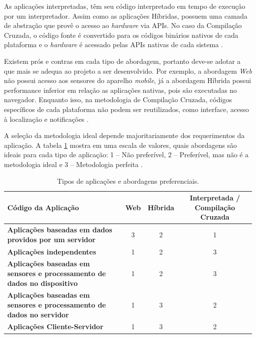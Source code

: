 As aplicações interpretadas, têm seu código interpretado em tempo de execução por um interpretador. Assim como as aplicações Híbridas, possuem uma camada de abstração que provê o acesso ao \textit{hardware} via APIs. No caso da Compilação Cruzada, o código fonte é convertido para os códigos binários nativos de cada plataforma e o \textit{hardware} é acessado pelas APIs nativas de cada sistema \cite{raj2012study}.

Existem prós e contras em cada tipo de abordagem, portanto deve-se adotar a que mais se adequa ao projeto a ser desenvolvido. Por exemplo, a abordagem \textit{Web} não possui acesso aos sensores do aparelho \textit{mobile}, já a abordagem Híbrida possui performance inferior em relação as aplicações nativas, pois são executadas no navegador. Enquanto isso, na metodologia de Compilação Cruzada, códigos específicos de cada plataforma não podem ser reutilizados, como interface, acesso à localização e notificações \cite{raj2012study}.

A seleção da metodologia ideal depende majoritariamente dos requerimentos da aplicação. A tabela \ref{tab:crossplatform} mostra em uma escala de valores, quais abordagens são ideais para cada tipo de aplicação: 1 – Não preferível, 2 – Preferível, mas não é a metodologia ideal e 3 – Metodologia perfeita \cite{raj2012study}.

\begin{table}[!htb]
	\centering
	\caption{\label{tab:crossplatform} Tipos de aplicações e abordagens preferenciais.}
	\begin{adjustbox}{max width=\textwidth}
		\begin{tabular}{@{} p{5cm} ccc @{}}
		\toprule
		\textbf{Código da Aplicação} & \textbf{Web} & \textbf{Híbrida} & \textbf{Interpretada / Compilação Cruzada} \\ \hline

		\textbf{Aplicações baseadas em dados providos por um servidor} &
			3 & 2 & 1
		\\ \hline

		\textbf{Aplicações independentes} & 1 & 2 & 3\\ \hline

		\textbf{Aplicações baseadas em sensores e processamento de dados no dispositivo} & 1 & 2 & 3\\ \hline

		\textbf{Aplicações baseadas em sensores e processamento de dados no servidor} & 1 & 3 & 2\\ \hline

		\textbf{Aplicações Cliente-Servidor} & 1 & 3 & 2 \\ \bottomrule
	\end{tabular}
	\end{adjustbox}
\end{table}


